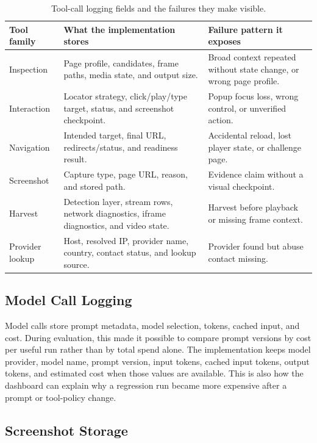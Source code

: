 \begin{table}[!htbp]
\centering
\begin{tabularx}{\textwidth}{Q{3.4cm}Y Y}
\toprule
{}
Tool family & What the implementation stores & Failure pattern it exposes \\
\midrule
Inspection & Page profile, candidates, frame paths, media state, and output
size. & Broad context repeated without state change, or wrong page profile. \\
Interaction & Locator strategy, click/play/type target, status, and screenshot
checkpoint. & Popup focus loss, wrong control, or unverified action. \\
Navigation & Intended target, final URL, redirects/status, and readiness
result. & Accidental reload, lost player state, or challenge page. \\
Screenshot & Capture type, page URL, reason, and stored path. & Evidence
claim without a visual checkpoint. \\
Harvest & Detection layer, stream rows, network diagnostics, iframe
diagnostics, and video state. & Harvest before playback or missing frame
context. \\
Provider lookup & Host, resolved IP, provider name, country, contact status,
and lookup source. & Provider found but abuse contact missing. \\
\bottomrule
\end{tabularx}
\caption{Tool-call logging fields and the failures they make visible.}
\label{tab:tool-call-review-main}
\end{table}

\subsection{Model Call Logging}

Model calls store prompt metadata, model selection, tokens, cached input, and
cost. During evaluation, this made it possible to compare prompt versions by
cost per useful run rather than by total spend alone. The implementation keeps
model provider, model name, prompt version, input tokens, cached input tokens,
output tokens, and estimated cost when those values are available. This is
also how the dashboard can explain why a regression run became more expensive
after a prompt or tool-policy change.

\subsection{Screenshot Storage}

